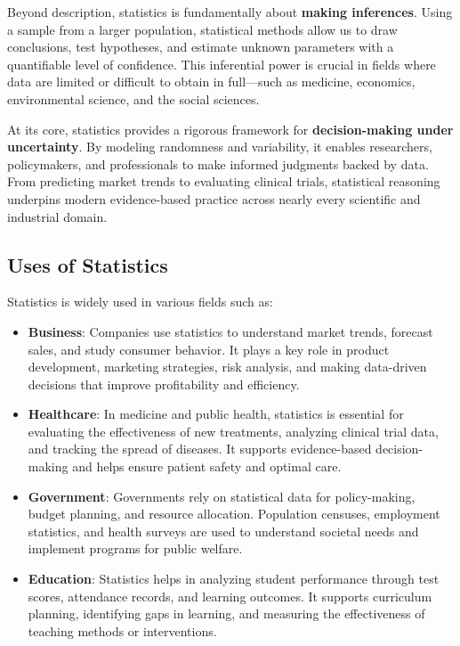 \documentclass[twoside]{book}
\begin{document}
Beyond description, statistics is fundamentally about \textbf{making inferences}. Using a sample from a larger population, statistical methods allow us to draw conclusions, test hypotheses, and estimate unknown parameters with a quantifiable level of confidence. This inferential power is crucial in fields where data are limited or difficult to obtain in full—such as medicine, economics, environmental science, and the social sciences.

At its core, statistics provides a rigorous framework for \textbf{decision-making under uncertainty}. By modeling randomness and variability, it enables researchers, policymakers, and professionals to make informed judgments backed by data. From predicting market trends to evaluating clinical trials, statistical reasoning underpins modern evidence-based practice across nearly every scientific and industrial domain.

\subsection{Uses of Statistics}

Statistics is widely used in various fields such as:

\begin{itemize}
    \item \textbf{Business}: Companies use statistics to understand market trends, forecast sales, and study consumer behavior. It plays a key role in product development, marketing strategies, risk analysis, and making data-driven decisions that improve profitability and efficiency.

    \item \textbf{Healthcare}: In medicine and public health, statistics is essential for evaluating the effectiveness of new treatments, analyzing clinical trial data, and tracking the spread of diseases. It supports evidence-based decision-making and helps ensure patient safety and optimal care.

    \item \textbf{Government}: Governments rely on statistical data for policy-making, budget planning, and resource allocation. Population censuses, employment statistics, and health surveys are used to understand societal needs and implement programs for public welfare.

    \item \textbf{Education}: Statistics helps in analyzing student performance through test scores, attendance records, and learning outcomes. It supports curriculum planning, identifying gaps in learning, and measuring the effectiveness of teaching methods or interventions.
\end{itemize}
\end{document}
